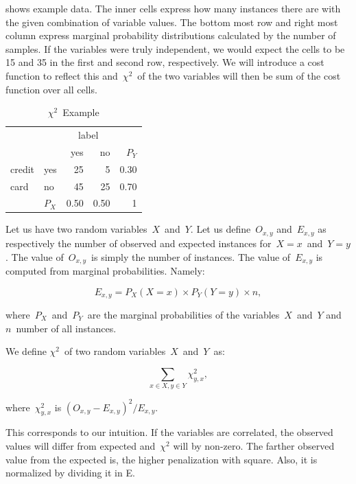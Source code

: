  shows example data.
The inner cells express how many instances there are with the given combination of variable values.
The bottom most row and right most column express marginal probability distributions
calculated by the number of samples.
If the variables were truly independent,
we would expect the cells to be 15 and 35 in the first and second row, respectively.
We will introduce a cost function to reflect this
and~$\chi^2$~of the two variables will then be sum of the cost function over all cells.


\begin{table}[h!]
 \center
 \begin{tabular}{ll|r|r|r}
 \cline{3-4}
        &       & \multicolumn{2}{c|}{label} & \\
        \cline{3-4}
        &       & yes        & no            & $P_Y$ \\
        \cline{1-4}
	 \multicolumn{1}{|l|}{credit} & yes   & 25         & 5             & 0.30 \\
        \cline{2-4}
	 \multicolumn{1}{|l|}{card}   & no    & 45         & 25            & 0.70 \\
        \cline{1-4}
		& \multicolumn{1}{l}{$P_X$} & \multicolumn{1}{l}{0.50}       & \multicolumn{1}{l}{0.50}          & 1
 
 \end{tabular}
 \caption{$\chi^2$~Example}
 \label{tab:chi_ex}
\end{table}

Let us have two random variables~$X$~and~$Y$.
Let us define~$O_{x,y}$ and~$E_{x,y}$
as respectively the number of observed and expected instances for~$X=x$~and~$Y=y$.
The value of~$O_{x,y}$~is simply the number of instances.
The value of~$E_{x,y}$ is computed from marginal probabilities.
Namely:

\begin{equation}
E_{x,y} = P_X(X=x) \times P_Y(Y=y) \times n,
\end{equation}

where~$P_X$~and~$P_Y$~are the marginal probabilities of the variables~$X$~and~$Y$
and~$n$~number of all instances.

We define $\chi^2$~of two random variables~$X$~and~$Y$~as:

$$\sum_{x \in X, y \in Y}{\chi^2_{y,x}},$$

where~${\chi^2_{y,x}}$ is $\left(O_{x,y} - E_{x,y} \right)^ 2 / E_{x,y}$.

This corresponds to our intuition.
If the variables are correlated,
the observed values will differ from expected and~$\chi^2$ will by non-zero.
The farther observed value from the expected is, the higher penalization with square.
Also, it is normalized by dividing it in E.

